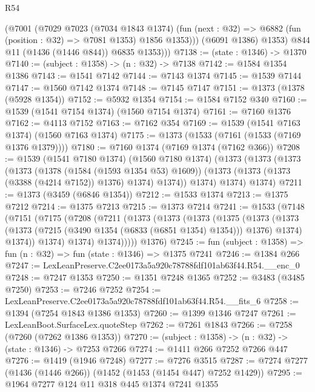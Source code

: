 \begin{lexlean}{R54}
\begin{coremodule}
            (@7001
              (@7029
                @7023
                (@7034 @1843 @1374)
                (fun (next : @32) => @6882 (fun (position : @32) => @7081 @1353) @1856 @1353)))
            (@6091 @1386)
            @1353)
          @844
          @11
          (@1436 (@1446 @844))
          @6835
          @1353)))
@7138 := (state : @1346) -> @1370
@7140 := (subject : @1358) -> (n : @32) -> @7138
@7142 := @1584 @1354 @1386
@7143 := @1541 @7142
@7144 := @7143 @1374
@7145 := @1539 @7144
@7147 := @1560 @7142 @1374
@7148 := @7145 @7147
@7151 := @1373 (@1378 (@5928 @1354))
@7152 := @5932 @1354
@7154 := @1584 @7152 @340
@7160 := @1539 (@1541 @7154 @1374) (@1560 @7154 @1374)
@7161 := @7160 @1376
@7162 := @4113 @7152
@7163 := @7162 @354
@7169 := @1539 (@1541 @7163 @1374) (@1560 @7163 @1374)
@7175 := @1373 (@1533 (@7161 (@1533 (@7169 @1376 @1379))))
@7180 := @7160 @1374 (@7169 @1374 (@7162 @366))
@7208 := @1539
    (@1541 @7180 @1374)
    (@1560 @7180 @1374)
    (@1373
      (@1373
        (@1373
          (@1373
            (@1378 (@1584 (@1593 @1354 @53) @1609))
            (@1373 (@1373 (@1373 (@3388 (@4214 @7152)) @1376) @1374) @1374))
          @1374)
        @1374)
      @1374)
@7211 := @1373 (@3459 (@6846 @1354))
@7212 := @1533 @1374
@7213 := @1375 @7212
@7214 := @1375 @7213
@7215 := @1373 @7214
@7241 := @1533
    (@7148
      (@7151
        (@7175
          (@7208
            (@7211
              (@1373
                (@1373
                  (@1373
                    (@1375
                      (@1373
                        (@1373
                          (@1373 (@7215 (@3490 @1354 (@6833 (@6851 @1354) @1354))) @1376)
                          @1374)
                        @1374))
                    @1374)
                  @1374)
                @1374)))))
      @1376)
@7245 := fun (subject : @1358) => fun (n : @32) => fun (state : @1346) => @1375 @7241
@7246 := @1384 @266
@7247 := LexLeanPreserve.C2ee0173a5a920c78788fdf101ab63f44.R54.__enc_0
@7248 := @7247 @1353
@7250 := @1351 @7248 @1365
@7252 := @3483 (@3485 @7250)
@7253 := @7246 @7252
@7254 := LexLeanPreserve.C2ee0173a5a920c78788fdf101ab63f44.R54.__fits_6
@7258 := @1394 (@7254 @1843 @1386 @1353)
@7260 := @1399 @1346 @7247
@7261 := LexLeanBoot.SurfaceLex.quoteStep
@7262 := @7261 @1843
@7266 := @7258 (@7260 (@7262 @1386 @1353))
@7270 := (subject : @1358) -> (n : @32) -> (state : @1346) -> @7253 @7266
@7274 := @1411 @266 @7252 @7266 @447
@7276 := @1419 (@1946 @7248)
@7277 := @7276 @3515
@7287 := @7274 @7277 (@1436 (@1446 @266)) (@1452 (@1453 (@1454 @447) @7252 @1429))
@7295 := @1964 @7277 @124 @11 @318 @445 @1374 @7241 @1355

\end{coremodule}
\end{lexlean}
